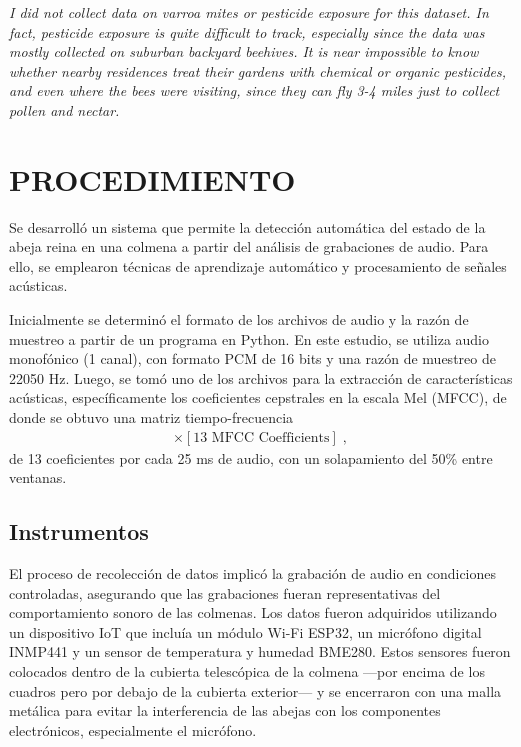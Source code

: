 \documentclass[12pt]{report}
\begin{document}
\par\textit{I did not collect data on varroa mites or pesticide exposure for this dataset. In fact, pesticide exposure is quite difficult to track, especially since the data was mostly collected on suburban backyard beehives. It is near impossible to know whether nearby residences treat their gardens with chemical or organic pesticides, and even where the bees were visiting, since they can fly 3-4 miles just to collect pollen and nectar.}


\section{PROCEDIMIENTO}

\par Se desarrolló un sistema que permite la detección automática del estado de la abeja reina en una colmena a partir del análisis de grabaciones de audio. Para ello, se emplearon técnicas de aprendizaje automático y procesamiento de señales acústicas.

\par Inicialmente se determinó el formato de los archivos de audio y la razón de muestreo a partir de un programa en Python. En este estudio, se utiliza audio monofónico (1 canal), con formato PCM de 16 bits y una razón de muestreo de 22050 Hz. Luego, se tomó uno de los archivos para la extracción de características acústicas, específicamente los coeficientes cepstrales en la escala Mel (MFCC), de donde se obtuvo una matriz tiempo-frecuencia
\begin{align*}
	[\text{Time Frames}] \times [\text{13 MFCC Coefficients}] \; ,
\end{align*}
de 13 coeficientes por cada 25 ms de audio, con un solapamiento del 50\% entre ventanas.

\subsection{Instrumentos}

\par El proceso de recolección de datos implicó la grabación de audio en condiciones controladas, asegurando que las grabaciones fueran representativas del comportamiento sonoro de las colmenas. Los datos fueron adquiridos utilizando un dispositivo IoT que incluía un módulo Wi-Fi ESP32, un micrófono digital INMP441 y un sensor de temperatura y humedad BME280. Estos sensores fueron colocados dentro de la cubierta telescópica de la colmena —por encima de los cuadros pero por debajo de la cubierta exterior— y se encerraron con una malla metálica para evitar la interferencia de las abejas con los componentes electrónicos, especialmente el micrófono.
\end{document}
